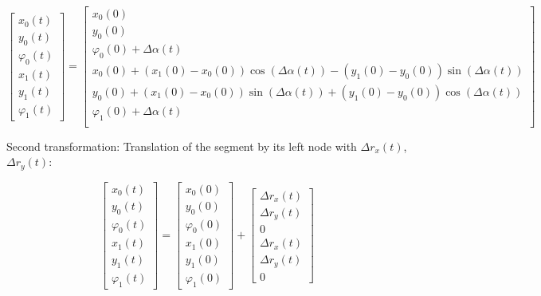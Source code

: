 \begin{equation}
\renewcommand\arraystretch{1.5}
\begin{bmatrix}
x_0(t) \\
y_0(t) \\
\varphi_0(t) \\
x_1(t) \\
y_1(t) \\
\varphi_1(t)
\end{bmatrix}
=
\begin{bmatrix}
x_0(0) \\
y_0(0) \\
\varphi_0(0) + \Delta\alpha(t) \\
x_0(0) + \left(x_1(0) - x_0(0)\right)\cos\left(\Delta\alpha(t)\right) - \left(y_1(0) - y_0(0)\right)\sin\left(\Delta\alpha(t)\right) \\
y_0(0) + \left(x_1(0) - x_0(0)\right)\sin\left(\Delta\alpha(t)\right) + \left(y_1(0) - y_0(0)\right)\cos\left(\Delta\alpha(t)\right) \\
\varphi_1(0) + \Delta\alpha(t) \\
\end{bmatrix}
\end{equation}

Second transformation: Translation of the segment by its left node with $\Delta r_x(t)$, $\Delta r_y(t)$:

\begin{equation}
\renewcommand\arraystretch{1.5}
\begin{bmatrix}
x_0(t) \\
y_0(t) \\
\varphi_0(t) \\
x_1(t) \\
y_1(t) \\
\varphi_1(t)
\end{bmatrix}
=
\begin{bmatrix}
x_0(0) \\
y_0(0) \\
\varphi_0(0) \\
x_1(0) \\
y_1(0) \\
\varphi_1(0)
\end{bmatrix}
+
\begin{bmatrix}
\Delta r_x(t) \\
\Delta r_y(t) \\
0 \\
\Delta r_x(t) \\
\Delta r_y(t) \\
0
\end{bmatrix}
\end{equation}

